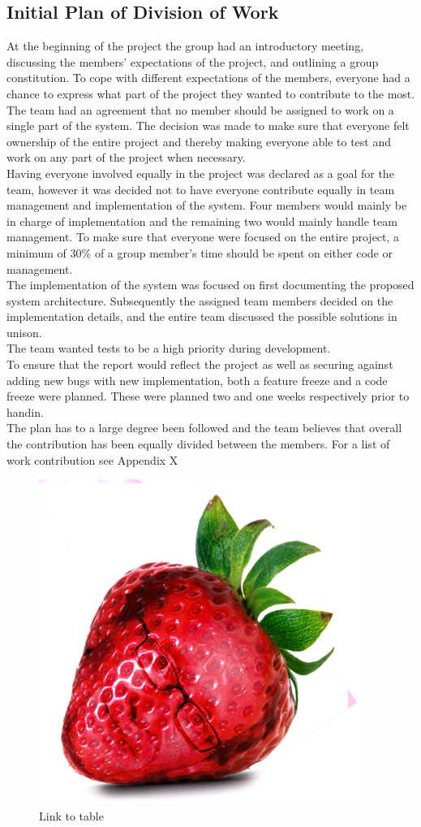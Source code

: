 \subsection{Initial Plan of Division of Work}
At the beginning of the project the group had an introductory meeting, discussing the members’ expectations of the project, and outlining a group constitution. \newline
To cope with different expectations of the members, everyone had a chance to express what part of the project they wanted to contribute to the most. The team had an agreement that no member should be assigned to work on a single part of the system. The decision was made to make sure that everyone felt ownership of the entire project and thereby making everyone able to test and work on any part of the project when necessary. \\

Having everyone involved equally in the project was declared as a goal for the team, however it was decided not to have everyone contribute equally in team management and implementation of the system. Four members would mainly be in charge of implementation and the remaining two would mainly handle team management. To make sure that everyone were focused on the entire project, a minimum of 30\% of a group member’s time should be spent on either code or management.\\

The implementation of the system was focused on first documenting the proposed system architecture. Subsequently the assigned team members decided on the implementation details, and the entire team discussed the possible solutions in unison.\\

The team wanted tests to be a high priority during development.\\

To ensure that the report would reflect the project as well as securing against adding new bugs with new implementation, both a feature freeze and a code freeze were planned. These were planned two and one weeks respectively prior to handin.\\

The plan has to a large degree been followed and the team believes that overall the contribution has been equally divided between the members. For a list of work contribution see Appendix X

\begin{figure}
\centering
\includegraphics[width=0.5\linewidth]{Figures/strawberry.png}
\caption{Link to table}
\end{figure}